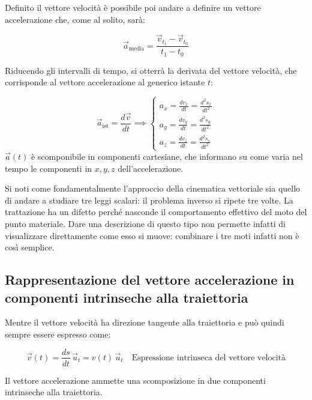 Definito il vettore velocità è possibile poi andare a definire un vettore accelerazione che, come al solito, sarà:

\[
	\vec{a}_{\text{media}}=\frac{\vec{v}_{t_1}-\vec{v}_{t_0}}{t_1-t_0}
\]

Riducendo gli intervalli di tempo, si otterrà la derivata del vettore velocità, che corrisponde al vettore accelerazione al generico istante $t$:

\[
	\vec{a}_{\text{ist}}=\frac{d\vec{v}}{dt} \implies
		\begin{cases}
		a_x=\frac{dv_x}{dt}=\frac{d^2s_x}{dt^2} \\
		a_y=\frac{dv_y}{dt}=\frac{d^2s_y}{dt^2}\\
		a_z=\frac{dv_z}{dt}=\frac{d^2s_z}{dt^2}
		\end{cases}
\]
$\vec{a}(t)$ è scomponibile in componenti cartesiane, che informano su come varia nel tempo le componenti in $x, y, z$ dell'accelerazione.

Si noti come fondamentalmente l'approccio della cinematica vettoriale sia quello di andare a studiare tre leggi scalari: il problema inverso si ripete tre volte. La trattazione ha un difetto perché nasconde il comportamento effettivo del moto del punto materiale. Dare una descrizione di questo tipo non permette infatti di visualizzare direttamente come esso si muove: combinare i tre moti infatti non è così semplice.

\subsection{Rappresentazione del vettore accelerazione in componenti intrinseche alla traiettoria}

Mentre il vettore velocità ha direzione tangente alla traiettoria e può quindi sempre essere espresso come:

\[
	\vec{v}(t)=\frac{ds}{dt}\,\vec{u}_t=v(t)\,\vec{u}_t \quad \text{Espressione intrinseca del vettore velocità}
\]

Il vettore accelerazione ammette una scomposizione in due componenti intrinseche alla traiettoria.

